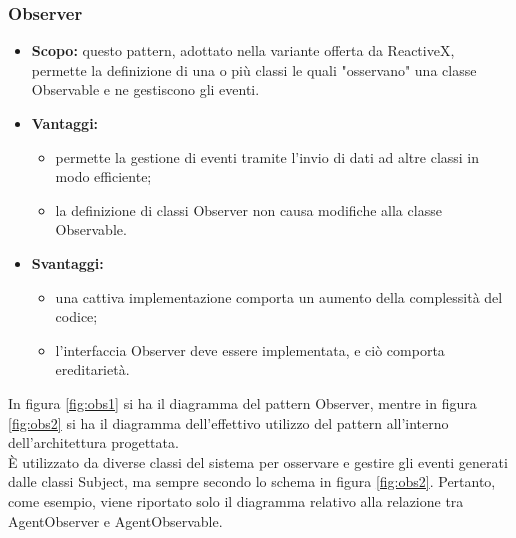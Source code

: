     \subsubsection{Observer}
      \begin{itemize}
       \item \textbf{Scopo:} questo pattern, adottato nella variante offerta da ReactiveX, permette la definizione di una o più classi  le quali "osservano" una classe Observable e ne gestiscono gli eventi.
	\item \textbf{Vantaggi:}
	  \begin{itemize}
	   \item permette la gestione di eventi tramite l'invio di dati ad altre classi in modo efficiente;
	   \item la definizione di classi Observer non causa modifiche alla classe Observable.
	  \end{itemize}
	\item \textbf{Svantaggi:}
	  \begin{itemize}
	   \item una cattiva implementazione comporta un aumento della complessità del codice;
	   \item l'interfaccia Observer deve essere implementata, e ciò comporta ereditarietà.
	  \end{itemize}
	\end{itemize}
	In figura \ref{fig:obs1} si ha il diagramma del pattern Observer, mentre in figura \ref{fig:obs2} si ha il diagramma dell'effettivo utilizzo del pattern all'interno dell'architettura progettata.\\
È utilizzato da diverse classi del sistema per osservare e gestire gli eventi generati dalle classi Subject, ma sempre secondo lo schema in figura \ref{fig:obs2}. Pertanto, come esempio, viene riportato solo il diagramma relativo alla relazione tra AgentObserver e AgentObservable.

